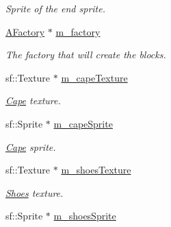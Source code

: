 \begin{DoxyCompactItemize}
\begin{DoxyCompactList}\small\item\em Sprite of the end sprite. \end{DoxyCompactList}\item 
\hypertarget{class_level_two_a912c4e3e5e2e6fefbd2353778e110111}{\hyperlink{class_a_factory}{A\-Factory} $\ast$ \hyperlink{class_level_two_a912c4e3e5e2e6fefbd2353778e110111}{m\-\_\-factory}}\label{class_level_two_a912c4e3e5e2e6fefbd2353778e110111}

\begin{DoxyCompactList}\small\item\em The factory that will create the blocks. \end{DoxyCompactList}\item 
\hypertarget{class_level_two_a7aec6b6a58fbb0fb4836dd058937076a}{sf\-::\-Texture $\ast$ \hyperlink{class_level_two_a7aec6b6a58fbb0fb4836dd058937076a}{m\-\_\-cape\-Texture}}\label{class_level_two_a7aec6b6a58fbb0fb4836dd058937076a}

\begin{DoxyCompactList}\small\item\em \hyperlink{class_cape}{Cape} texture. \end{DoxyCompactList}\item 
\hypertarget{class_level_two_a6007c5a2be8b96f863a58c94683ad47b}{sf\-::\-Sprite $\ast$ \hyperlink{class_level_two_a6007c5a2be8b96f863a58c94683ad47b}{m\-\_\-cape\-Sprite}}\label{class_level_two_a6007c5a2be8b96f863a58c94683ad47b}

\begin{DoxyCompactList}\small\item\em \hyperlink{class_cape}{Cape} sprite. \end{DoxyCompactList}\item 
\hypertarget{class_level_two_adc6a65f9f141a466fff0e8343904e7af}{sf\-::\-Texture $\ast$ \hyperlink{class_level_two_adc6a65f9f141a466fff0e8343904e7af}{m\-\_\-shoes\-Texture}}\label{class_level_two_adc6a65f9f141a466fff0e8343904e7af}

\begin{DoxyCompactList}\small\item\em \hyperlink{class_shoes}{Shoes} texture. \end{DoxyCompactList}\item 
\hypertarget{class_level_two_af0eaf32e30de697697d1bace185fe29f}{sf\-::\-Sprite $\ast$ \hyperlink{class_level_two_af0eaf32e30de697697d1bace185fe29f}{m\-\_\-shoes\-Sprite}}\label{class_level_two_af0eaf32e30de697697d1bace185fe29f}


\end{DoxyCompactItemize}
